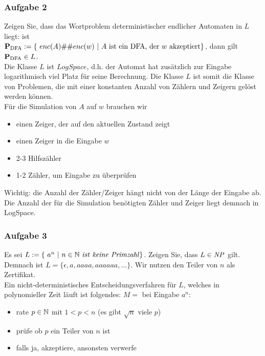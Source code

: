 \newpage
\subsubsection*{Aufgabe 2}
    Zeigen Sie, dass das Wortproblem deterministischer endlicher Automaten in $L$ liegt: ist \\
    $\prspec{DFA} := \{\ enc(A) \#\# enc(w)\ |\ A\ \text{ist ein DFA, der $w$ akzeptiert} \}$, dann gilt $\textbf{P}_{\text{DFA}} \in L$. \\

    \LOES Die Klasse $L$ ist $LogSpace$, d.h. der Automat hat zusätzlich zur Eingabe logarithmisch viel Platz für seine Berechnung. Die Klasse $L$ ist somit die Klasse von Problemen, die mit einer konstanten Anzahl von Zählern und Zeigern gelöst werden können. \\

    Für die Simulation von $A$ auf $w$ brauchen wir
    \begin{itemize}
        \item einen Zeiger, der auf den aktuellen Zustand zeigt
        \item einen Zeiger in die Eingabe $w$
        \item 2-3 Hilfszähler
        \item 1-2 Zähler, um Eingabe zu überprüfen
    \end{itemize}
    Wichtig: die Anzahl der Zähler/Zeiger hängt nicht von der Länge der Eingabe ab.
    Die Anzahl der für die Simulation benötigten Zähler und Zeiger liegt demnach in LogSpace.


\subsubsection*{Aufgabe 3}
    Es sei $L := \{\ a^{n}\ |\ n \in \N\ \MT{ist\ keine\ Primzahl} \}$. Zeigen Sie, dass $L \in \mathit{NP}$ gilt. \\

    \LOES Demnach ist $L = \{ \epsilon, a, aaaa, aaaaaa, \dots \}$. Wir nutzen den Teiler von $n$ als Zertifikat. \\
    Ein nicht-deterministisches Entscheidungsverfahren für $L$, welches in polynomieller Zeit läuft ist folgendes: $M =$ bei Eingabe $a^{n}$:
    \begin{itemize}
        \item rate $p \in \mathbb{N}$ mit $1 < p < n$ (es gibt $\sqrt{n}$ viele $p$)
        \item prüfe ob $p$ ein Teiler von $n$ ist
        \item falls ja, akzeptiere, ansonsten verwerfe
    \end{itemize}

